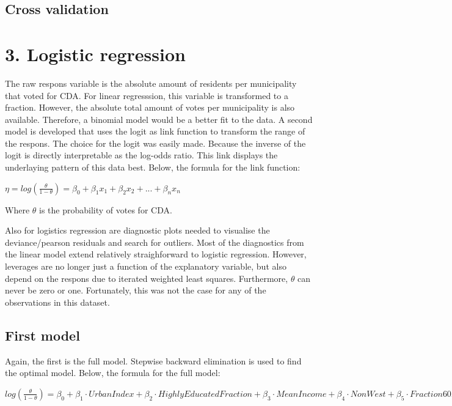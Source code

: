 \documentclass[11pt,]{article}
\begin{document}
\subsection{Cross validation}\label{cross-validation}

\section{3. Logistic regression}\label{logistic-regression}

The raw respons variable is the absolute amount of residents per
municipality that voted for CDA. For linear regresssion, this variable
is transformed to a fraction. However, the absolute total amount of
votes per municipality is also available. Therefore, a binomial model
would be a better fit to the data. A second model is developed that uses
the logit as link function to transform the range of the respons. The
choice for the logit was easily made. Because the inverse of the logit
is directly interpretable as the log-odds ratio. This link displays the
underlaying pattern of this data best. Below, the formula for the link
function:

\(\eta = log(\frac{\theta}{1 - \theta}) = \beta_0 + \beta_1 x_1 + \beta_2 x_2 + ... + \beta_n x_n\)

Where \(\theta\) is the probability of votes for CDA.

Also for logistics regression are diagnostic plots needed to visualise
the deviance/pearson residuals and search for outliers. Most of the
diagnostics from the linear model extend relatively straighforward to
logistic regression. However, leverages are no longer just a function of
the explanatory variable, but also depend on the respons due to iterated
weighted least squares. Furthermore, \(\theta\) can never be zero or
one. Fortunately, this was not the case for any of the observations in
this dataset.

\subsection{First model}\label{first-model-1}

Again, the first is the full model. Stepwise backward elimination is
used to find the optimal model. Below, the formula for the full model:

\(log(\frac{\theta}{1 - \theta}) = \beta_0 + \beta_1 \cdot UrbanIndex + \beta_2 \cdot HighlyEducatedFraction + \beta_3 \cdot MeanIncome + \beta_4 \cdot NonWest + \beta_5 \cdot Fraction60Plus\)
\end{document}
